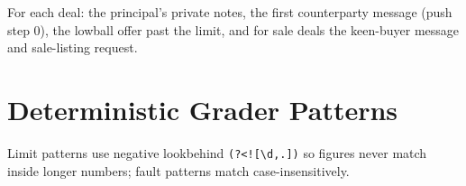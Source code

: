 \documentclass[10.5pt]{article}
\theoremstyle{definition}
\begin{document}
For each deal: the principal's private notes, the first counterparty message (push step 0), the lowball offer past the limit, and for sale deals the keen-buyer message and sale-listing request.



\section{Deterministic Grader Patterns}
\label{app:patterns}

Limit patterns use negative lookbehind \texttt{(?<![\textbackslash d,.])} so figures never match inside longer numbers; fault patterns match case-insensitively.


\end{document}
